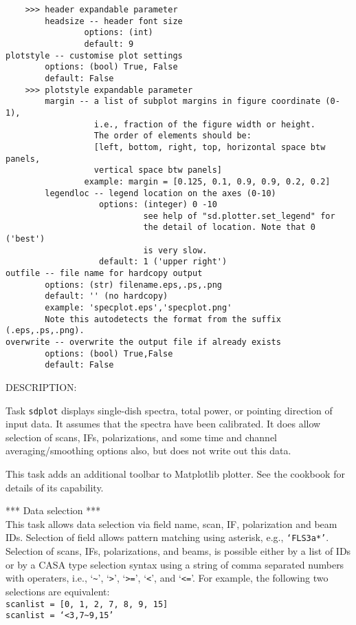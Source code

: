 \begin{verbatim}
    >>> header expandable parameter
        headsize -- header font size
                options: (int)
                default: 9
plotstyle -- customise plot settings
        options: (bool) True, False
        default: False
    >>> plotstyle expandable parameter
        margin -- a list of subplot margins in figure coordinate (0-1), 
                  i.e., fraction of the figure width or height.
                  The order of elements should be:
                  [left, bottom, right, top, horizontal space btw panels,
                  vertical space btw panels]
                example: margin = [0.125, 0.1, 0.9, 0.9, 0.2, 0.2]
        legendloc -- legend location on the axes (0-10)
                   options: (integer) 0 -10 
                            see help of "sd.plotter.set_legend" for 
                            the detail of location. Note that 0 ('best')
                            is very slow. 
                   default: 1 ('upper right')
outfile -- file name for hardcopy output
        options: (str) filename.eps,.ps,.png
        default: '' (no hardcopy)
        example: 'specplot.eps','specplot.png'
        Note this autodetects the format from the suffix (.eps,.ps,.png).
overwrite -- overwrite the output file if already exists
        options: (bool) True,False
        default: False
\end{verbatim}

DESCRIPTION:
    
Task {\tt sdplot} displays single-dish spectra, total power,
or pointing direction of input data.
It assumes that the spectra have been calibrated.
It does allow selection of scans, IFs, polarizations, and
some time and channel averaging/smoothing options also,
but does not write out this data.

This task adds an additional toolbar to Matplotlib plotter. 
See the cookbook for details of its capability.

*** Data selection ***\\
This task allows data selection via field name, scan, IF,
polarization and beam IDs. Selection of field allows pattern
matching using asterisk, e.g., {\tt `FLS3a*'}. Selection of scans,
IFs, polarizations, and beams, is possible either by a list
of IDs or by a CASA type selection syntax using a string of 
comma separated numbers with operaters, i.e., `{\tt \~{}}', `{\tt >}', `{\tt >=}',
`{\tt <}', and `{\tt <=}'.
For example, the following two selections are equivalent:\\
{\tt scanlist = [0, 1, 2, 7, 8, 9, 15]}\\
{\tt scanlist = `<3,7\~{}9,15'}


